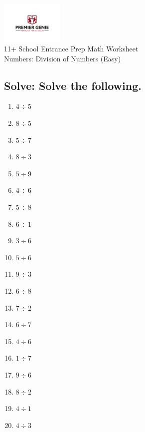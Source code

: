 \documentclass{article}
\begin{document}
\begin{center}
\includegraphics[width=3cm]{PREMGENIEJPG.jpg}\\
{\Large 11+ School Entrance Prep Math Worksheet}\\
{\Medium Numbers: Division of Numbers (Easy)}\\

\end{center}

\subsection*{Solve: Solve the following.}

\begin{enumerate}
\item $\displaystyle {4}\div{5} $ \ 
\item $\displaystyle {8}\div{5} $ \ 
\item $\displaystyle {5}\div{7} $ \ 
\item $\displaystyle {8}\div{3} $ \ 
\item $\displaystyle {5}\div{9} $ \ 
\item $\displaystyle {4}\div{6} $ \ 
\item $\displaystyle {5}\div{8} $ \ 
\item $\displaystyle {6}\div{1} $ \ 
\item $\displaystyle {3}\div{6} $ \ 
\item $\displaystyle {5}\div{6} $ \ 
\item $\displaystyle {9}\div{3} $ \ 
\item $\displaystyle {6}\div{8} $ \ 
\item $\displaystyle {7}\div{2} $ \ 
\item $\displaystyle {6}\div{7} $ \ 
\item $\displaystyle {4}\div{6} $ \ 
\item $\displaystyle {1}\div{7} $ \ 
\item $\displaystyle {9}\div{6} $ \ 
\item $\displaystyle {8}\div{2} $ \ 
\item $\displaystyle {4}\div{1} $ \ 
\item $\displaystyle {4}\div{3} $ \ 


\end{enumerate}
\end{document}
